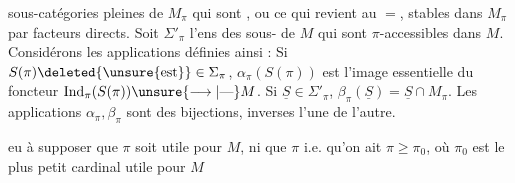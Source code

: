 sous-catégories  pleines  de $M_\pi$
qui sont , ou ce qui
revient au $=$, stables  dans $M_\pi$ par
facteurs directs. Soit $\Sigma'_\pi$ l'ens
des sous- de $M$ qui sont
$\pi$-accessibles dans $M$. Considérons
les applications
définies ainsi : Si $S(\pi)\deleted{\text{\unsure{est}}}\in\Sigma_\pi$,
$\alpha_\pi(S(\pi))$ est l'image essentielle du
foncteur  $\mathrm{Ind}_\pi(S(\pi))\unsure{\longrightarrow|\text{---}} M$.
Si $\underline S\in\Sigma'_\pi$, $\beta_\pi(\underline S)=\underline S\cap M_\pi$.
Les applications $\alpha_\pi,\beta_\pi$ sont des
bijections, inverses l'une de
l'autre. 

  eu à supposer que
$\pi$ soit utile pour $M$, ni que $\pi$
 
i.e. qu'on ait $\pi\geq\pi_0$, où
$\pi_0$ est le plus petit cardinal utile pour $M$
